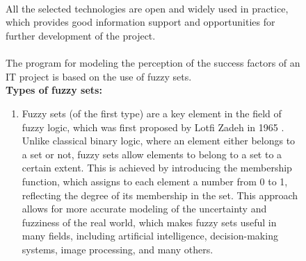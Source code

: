 \documentclass{article}
\begin{document}
\begin{figure}[!t]
\begin{minipage}{0.49\textwidth}
            ~\\
            ~\\
            ~\\
            ~\\
            ~\\
            ~\\
            ~\\
            ~\\
            ~\\
            ~\\
            ~\\
            ~\\
            ~\\
            ~\\
            ~\\
            ~\\
            ~\\
            ~\\
            ~\\
            ~\\
            ~\\
            ~\\
            ~\\
            ~\\
            ~\\
        \end{minipage}
        \hfill
        \begin{minipage}{0.49\textwidth}
            All the selected technologies are open and widely used in practice, which provides good information support and opportunities for further development of the project.\\
            ~\\
            The program for modeling the perception of the success factors of an IT project is based on the use of fuzzy sets.\\
            \textbf{Types of fuzzy sets:}
            \begin{enumerate}
                \item Fuzzy sets (of the first type) are a key element in the field of fuzzy logic, which was first proposed by Lotfi Zadeh in 1965 \cite{litlink21}. Unlike classical binary logic, where an element either belongs to a set or not, fuzzy sets allow elements to belong to a set to a certain extent. This is achieved by introducing the membership function, which assigns to each element a number from 0 to 1, reflecting the degree of its membership in the set. This approach allows for more accurate modeling of the uncertainty and fuzziness of the real world, which makes fuzzy sets useful in many fields, including artificial intelligence, decision-making systems, image processing, and many others.\\

\end{enumerate}
\end{minipage}
\end{figure}
\end{document}
